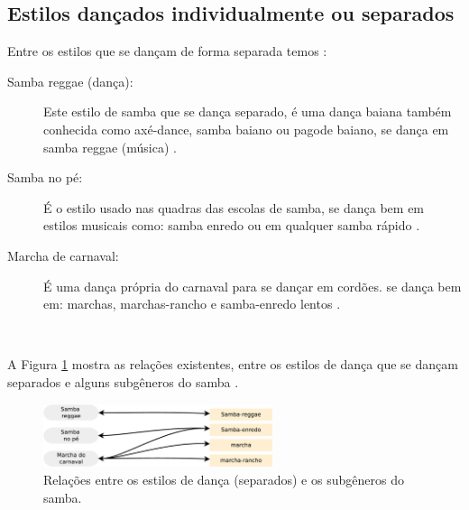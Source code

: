 \subsection{Estilos dançados individualmente ou separados }
Entre os estilos que se dançam de forma separada temos \cite[pp. 134]{perna2002samba}:
\begin{description}
\item[Samba reggae  (dança):] Este estilo de samba que se dança separado, 
é uma dança baiana também conhecida como axé-dance, samba baiano ou pagode baiano,
se dança em samba reggae (música) \cite[pp. 134]{perna2002samba}.

\item[Samba no pé:] É o estilo usado nas quadras das escolas de samba,
se dança bem em estilos musicais como: 
samba enredo ou em qualquer samba rápido  \cite[pp. 134]{perna2002samba}.

\item[Marcha de carnaval:] É uma dança própria do carnaval para se dançar em cordões.
se dança bem em: marchas, marchas-rancho e samba-enredo lentos  \cite[pp. 135]{perna2002samba}.

\end{description}
~

A Figura \ref{fig:sambadavavsmusicaseparado} mostra as relações existentes, 
entre os estilos de dança que se dançam separados e alguns subgêneros do samba  \cite[pp. 134-138]{perna2002samba}.

\begin{figure}[h]
  \centering
    \includegraphics[width=0.6\textwidth]{chapters/cap-historia-musicasamba/dancavcmusicaseparado.eps}
  \caption{Relações entre os estilos de dança (separados) e os subgêneros do samba.}
\label{fig:sambadavavsmusicaseparado}
\end{figure}
